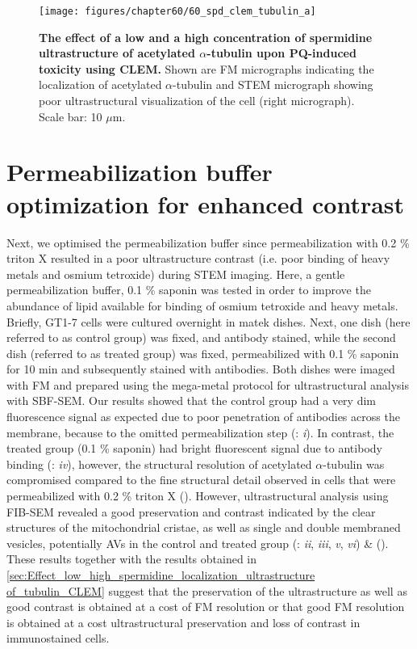 \begin{landscape}
\begin{figure}[!htbp]
\vspace{2cm}
\center
 \texttt{[image: figures/chapter60/60\_spd\_clem\_tubulin\_a]}
 \caption[The effect of a low and a high concentration of spermidine ultrastructure of acetylated $\alpha$-tubulin upon PQ-induced toxicity using CLEM]{\textbf{The effect of a low and a high concentration of spermidine ultrastructure of acetylated $\alpha$-tubulin upon PQ-induced toxicity using CLEM.} Shown are FM micrographs indicating the localization of acetylated $\alpha$-tubulin and STEM micrograph showing poor ultrastructural visualization of the cell (right micrograph). Scale bar: 10 $\mu$m.}
 \label{fig:60_spd_clem_tubulin_a}
\end{figure} 
\end{landscape}

\section{Permeabilization buffer optimization for enhanced contrast}
Next, we optimised the permeabilization buffer since permeabilization with 0.2 \% triton X resulted in a poor ultrastructure contrast (i.e. poor binding of heavy metals and osmium tetroxide) during STEM imaging. Here, a gentle permeabilization buffer, 0.1 \% saponin was tested in order to improve the abundance of lipid available for binding of osmium tetroxide and heavy metals. Briefly, GT1-7 cells were cultured overnight in matek dishes. Next, one dish (here referred to as control group) was fixed, and antibody stained, while the second dish (referred to as treated group) was fixed, permeabilized with 0.1 \% saponin for 10 min and subsequently stained with antibodies. Both dishes were imaged with FM and prepared using the mega-metal protocol for ultrastructural analysis with SBF-SEM. Our results showed that the control group had a very dim fluorescence signal as expected due to poor penetration of antibodies across the membrane, because to the omitted permeabilization step (: \textit{i}). In contrast, the treated group (0.1 \% saponin) had bright fluorescent signal due to antibody binding (: \textit{iv}), however, the structural resolution of acetylated $\alpha$-tubulin was compromised compared to the fine structural detail observed in cells that were permeabilized with 0.2 \% triton X (). However, ultrastructural analysis using FIB-SEM revealed a good preservation and contrast indicated by the clear structures of the mitochondrial cristae, as well as single and double membraned vesicles, potentially AVs in the control and treated group (: \textit{ii}, \textit{iii}, \textit{v}, \textit{vi}) \& (). These results together with the results obtained in \cref{sec:Effect_low_high_spermidine_localization_ultrastructure of_tubulin_CLEM} suggest that the preservation of the ultrastructure as well as good contrast is obtained at a cost of FM resolution or that good FM resolution is obtained at a cost ultrastructural preservation and loss of contrast in immunostained cells.

